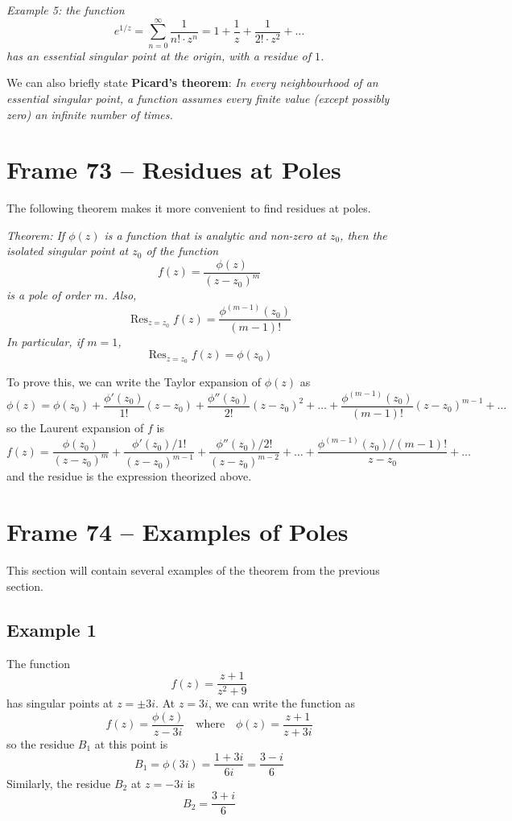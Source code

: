 \documentclass{article}
\renewcommand{\emph}{\textbf}
\DeclareMathOperator{\Res}{Res}
\begin{document}
\textit{Example 5: the function
\[
	e^{1/z}
	= \sum_{n=0}^\infty \frac{1}{n! \cdot z^n}
	= 1 + \frac{1}{z} + \frac{1}{2! \cdot z^2} + \dots
\]
has an essential singular point at the origin, with a residue of $1$.}

We can also briefly state \emph{Picard's theorem}: \textit{In every neighbourhood of an essential singular point, a function assumes every finite value (except possibly zero) an infinite number of times.}


\clearpage
\section{Frame 73 -- Residues at Poles}
The following theorem makes it more convenient to find residues at poles.

\textit{Theorem: If $\phi(z)$ is a function that is analytic and non-zero at $z_0$, then the isolated singular point at $z_0$ of the function 
\[
	f(z) = \frac{\phi(z)}{(z - z_0)^m}
\]
is a pole of order $m$. Also, 
\[
	\Res_{z = z_0} f(z) = \frac{\phi^{(m-1)}(z_0)}{(m - 1)!}
\]
In particular, if $m = 1$,
\[
	\Res_{z = z_0} f(z) = \phi(z_0)
\]}

To prove this, we can write the Taylor expansion of $\phi(z)$ as
\[
	\phi(z)
	= \phi(z_0)
	+ \frac{\phi' (z_0)}{1!} (z - z_0)
	+ \frac{\phi''(z_0)}{2!} (z - z_0)^2
	+ \dots
	+ \frac{\phi^{(m-1)}(z_0)}{(m-1)!} (z - z_0)^{m-1}
	+ \dots
\]
so the Laurent expansion of $f$ is
\[
	f(z)
	= \frac{\phi(z_0)}{(z - z_0)^m}
	+ \frac{\phi'(z_0) / 1!}{(z - z_0)^{m-1}}
	+ \frac{\phi''(z_0)/ 2!}{(z - z_0)^{m-2}}
	+ \dots
	+ \frac{\phi^{(m-1)}(z_0) / (m-1)!}{z - z_0}
	+ \dots
\]
and the residue is the expression theorized above.


\clearpage
\section{Frame 74 -- Examples of Poles}
This section will contain several examples of the theorem from the previous section.

\subsection{Example 1}
The function
\[
	f(z) = \frac{z + 1}{z^2 + 9}
\]
has singular points at $z = \pm 3i$. At $z = 3i$, we can write the function as
\[
	f(z) = \frac{\phi(z)}{z - 3i} \quad \text{where} \quad
	\phi(z) = \frac{z+1}{z + 3i}
\]
so the residue $B_1$ at this point is
\[
	B_1 = \phi(3i)
	= \frac{1 + 3i}{6i}
	= \frac{3 - i}{6}
\]
Similarly, the residue $B_2$ at $z = -3i$ is
\[
	B_2 = \frac{3 + i}{6}
\]
\end{document}
